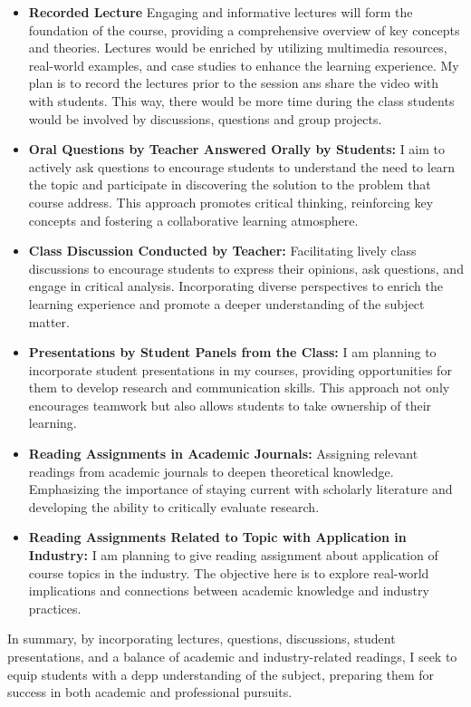 \begin {itemize}
 \item  {\bf    Recorded Lecture}
        Engaging and informative lectures will form the foundation of the course, providing a comprehensive overview of key concepts and theories.
        Lectures would be enriched by utilizing multimedia resources, real-world examples, and case studies to enhance the learning experience. My plan is to record the lectures prior to the session ans share the video with with students.  This way, there would be more time during the class students would be involved by discussions, questions and group projects. 
\item  {\bf    Oral Questions by Teacher Answered Orally by Students:}
        I aim to actively ask questions to encourage students to understand the need to learn the topic and participate in discovering the solution to the problem that course address.  This approach promotes critical thinking, reinforcing key concepts and fostering a collaborative learning atmosphere.
 \item{\bf    Class Discussion Conducted by Teacher: }
        Facilitating lively class discussions to encourage students to express their opinions, ask questions, and engage in critical analysis.
        Incorporating diverse perspectives to enrich the learning experience and promote a deeper understanding of the subject matter.
\item { \bf    Presentations by Student Panels from the Class:}
        I am planning to incorporate student presentations in my courses, providing opportunities for them to develop research and communication skills. This approach not only encourages teamwork but also allows students to take ownership of their learning.
\item  {\bf   Reading Assignments in Academic Journals:}
        Assigning relevant readings from academic journals to deepen theoretical knowledge.
        Emphasizing the importance of staying current with scholarly literature and developing the ability to critically evaluate research.
\item{ \bf     Reading Assignments Related to Topic with Application in Industry: }
        I am planning to give reading assignment about application of course topics in the industry. The objective here is to explore real-world implications and connections between academic knowledge and industry practices.
\end {itemize}
In summary, by incorporating lectures, questions, discussions, student presentations, and a balance of academic and industry-related readings, I seek to equip students with a depp understanding of the subject, preparing them for success in both academic and professional pursuits.
